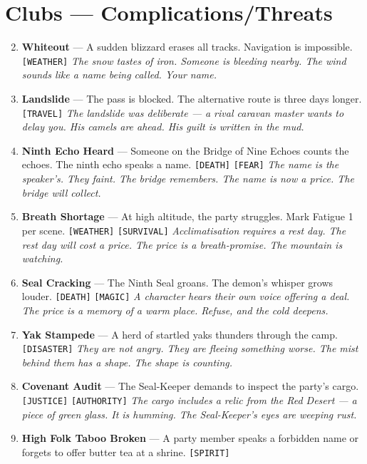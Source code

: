 \section*{Clubs --- Complications/Threats}
\label{sec:himadri-complications}
\begin{enumerate}
\setcounter{enumi}{1}
\item \textbf{Whiteout} --- A sudden blizzard erases all tracks. Navigation is impossible. \texttt{[WEATHER]}
  \hfill \textit{The snow tastes of iron. Someone is bleeding nearby. The wind sounds like a name being called. Your name.}
\item \textbf{Landslide} --- The pass is blocked. The alternative route is three days longer. \texttt{[TRAVEL]}
  \hfill \textit{The landslide was deliberate --- a rival caravan master wants to delay you. His camels are ahead. His guilt is written in the mud.}
\item \textbf{Ninth Echo Heard} --- Someone on the Bridge of Nine Echoes counts the echoes. The ninth echo speaks a name. \texttt{[DEATH]} \texttt{[FEAR]}
  \hfill \textit{The name is the speaker's. They faint. The bridge remembers. The name is now a price. The bridge will collect.}
\item \textbf{Breath Shortage} --- At high altitude, the party struggles. Mark Fatigue 1 per scene. \texttt{[WEATHER]} \texttt{[SURVIVAL]}
  \hfill \textit{Acclimatisation requires a rest day. The rest day will cost a price. The price is a breath-promise. The mountain is watching.}
\item \textbf{Seal Cracking} --- The Ninth Seal groans. The demon's whisper grows louder. \texttt{[DEATH]} \texttt{[MAGIC]}
  \hfill \textit{A character hears their own voice offering a deal. The price is a memory of a warm place. Refuse, and the cold deepens.}
\item \textbf{Yak Stampede} --- A herd of startled yaks thunders through the camp. \texttt{[DISASTER]}
  \hfill \textit{They are not angry. They are fleeing something worse. The mist behind them has a shape. The shape is counting.}
\item \textbf{Covenant Audit} --- The Seal-Keeper demands to inspect the party's cargo. \texttt{[JUSTICE]} \texttt{[AUTHORITY]}
  \hfill \textit{The cargo includes a relic from the Red Desert --- a piece of green glass. It is humming. The Seal-Keeper's eyes are weeping rust.}
\item \textbf{High Folk Taboo Broken} --- A party member speaks a forbidden name or forgets to offer butter tea at a shrine. \texttt{[SPIRIT]}

\end{enumerate}
